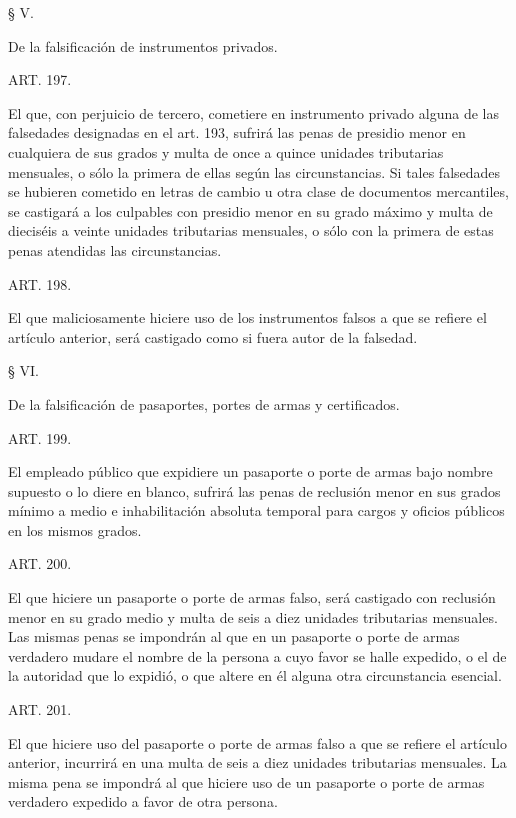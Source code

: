     § V.

    De la falsificación de instrumentos privados.



    ART. 197.

    El que, con perjuicio de tercero, cometiere en instrumento privado alguna de las falsedades designadas en el art. 193, sufrirá las penas de presidio menor en cualquiera de sus grados y multa de once a quince unidades tributarias mensuales, o sólo la primera de ellas según las circunstancias.
    Si tales falsedades se hubieren cometido en letras de cambio u otra clase de documentos mercantiles, se castigará a los culpables con presidio menor en su grado máximo y multa de dieciséis a veinte unidades tributarias mensuales, o sólo con la primera de estas penas atendidas las circunstancias.





    ART. 198.

    El que maliciosamente hiciere uso de los instrumentos falsos a que se refiere el artículo anterior, será castigado como si fuera autor de la falsedad.


    § VI.

    De la falsificación de pasaportes, portes de armas y certificados.


    ART. 199.

    El empleado público que expidiere un pasaporte o porte de armas bajo nombre supuesto o lo diere en blanco, sufrirá las penas de reclusión menor en sus grados mínimo a medio e inhabilitación absoluta temporal para cargos y oficios públicos en los mismos grados.


    ART. 200.

    El que hiciere un pasaporte o porte de armas falso, será castigado con reclusión menor en su grado medio y multa de seis a diez unidades tributarias mensuales.
    Las mismas penas se impondrán al que en un pasaporte o porte de armas verdadero mudare el nombre de la persona a cuyo favor se halle expedido, o el de la autoridad que lo expidió, o que altere en él alguna otra circunstancia esencial.





    ART. 201.

    El que hiciere uso del pasaporte o porte de armas falso a que se refiere el artículo anterior, incurrirá en una multa de seis a diez unidades tributarias mensuales.
    La misma pena se impondrá al que hiciere uso de un pasaporte o porte de armas verdadero expedido a favor de otra persona.






